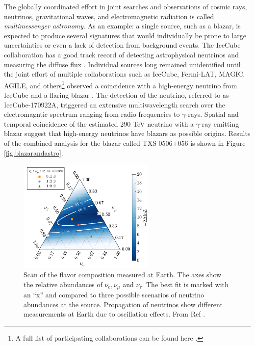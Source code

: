 The globally coordinated effort in joint searches and observations of cosmic rays, neutrinos, gravitational waves, and electromagnetic radiation is called \textit{multimessenger astronomy}. As an example: a single source, such as a blazar, is expected to produce several signatures that would individually be prone to large uncertainties or even a lack of detection from background events. The IceCube collaboration has a good track record of detecting astrophysical neutrinos and measuring the diffuse flux \cite{Klein:2018fnn,Aartsen:2017mau}. Individual sources long remained unidentified until the joint effort of multiple collaborations such as IceCube, Fermi-LAT, MAGIC, AGILE, and others\footnote{A full list of participating collaborations can be found here \cite{IceCube:2018dnn}.} observed a coincidence with a high-energy neutrino from IceCube and a flaring blazar \cite{IceCube:2018dnn}. The detection of the neutrino, referred to as IceCube-170922A, triggered an extensive multiwavelength search over the electromagntic spectrum ranging from radio frequencies to $\gamma$-rays. Spatial and temporal coincidence of the estimated 290 TeV neutrino with a $\gamma$-ray emitting blazar suggest that high-energy neutrinos have blazars as possible origins. Results of the combined analysis for the blazar called TXS 0506+056 is shown in Figure \ref{fig:blazarandastro}. 

\begin{figure}[t]
\centering
\includegraphics[width=0.6\textwidth]{chapter5/img/FlavorTriangle.png}
\caption{Scan of the flavor composition measured at Earth. The axes show the relative abundances of $\nu_e, \nu_\mu$ and $\nu_\tau$. The best fit is marked with an ``x'' and compared to three possible scenarios of neutrino abundances at the source. Propagation of neutrinos show different measurements at Earth due to oscillation effects. From Ref \cite{Aartsen:2015knd}.}
\label{fig:triangle}
\end{figure}


